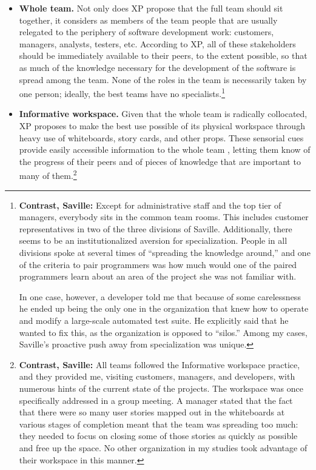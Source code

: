 \begin{itemize}
\item \textbf{Whole team.} Not only does XP propose that the full team should sit together, it considers as members of the team people that are usually relegated to the periphery of software development work: customers, managers, analysts, testers, etc. According to XP, all of these stakeholders should be immediately available to their peers, to the extent possible, so that as much of the knowledge necessary for the development of the software is spread among the team. None of the roles in the team is necessarily taken by one person; ideally, the best teams have no specialists.\footnote{\textbf{Contrast, Saville:} Except for administrative staff and the top tier of managers, everybody sits in the common team rooms. This includes customer representatives in two of the three divisions of Saville. Additionally, there seems to be an institutionalized aversion for specialization. People in all divisions spoke at several times of ``spreading the knowledge around,'' and one of the criteria to pair programmers was how much would one of the paired programmers learn about an area of the project she was not familiar with.
\par In one case, however, a developer told me that because of some carelessness he ended up being the only one in the organization that knew how to operate and modify a large-scale automated test suite. He explicitly said that he wanted to fix this, as the organization is opposed to ``silos.'' Among my cases, Saville's proactive push away from specialization was unique.}

\item \textbf{Informative workspace.} Given that the whole team is radically collocated, XP proposes to make the best use possible of its physical workspace through heavy use of whiteboards, story cards, and other props. These sensorial cues provide easily accessible information to the whole team \cite{Olson2000}, letting them know of the progress of their peers and of pieces of knowledge that are important to many of them.\footnote{\textbf{Contrast, Saville:} All teams followed the Informative workspace practice, and they provided me, visiting customers, managers, and developers, with numerous hints of the current state of the projects. The workspace was once specifically addressed in a group meeting. A manager stated that the fact that there were so many user stories mapped out in the whiteboards at various stages of completion meant that the team was spreading too much: they needed to focus on closing some of those stories as quickly as possible and free up the space. No other organization in my studies took advantage of their workspace in this manner.}


\end{itemize}
